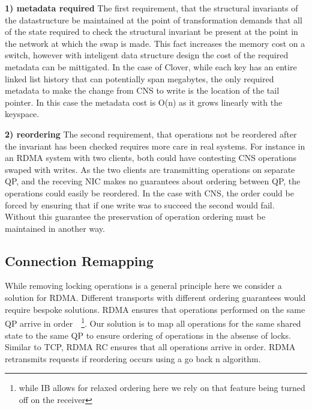 \textbf{1) metadata required} The first requirement, that the structural invariants
of the datastructure be maintained at the point of transformation demands that
all of the state required to check the structural invariant be present at the
point in the network at which the swap is made. This fact increases the memory
cost on a switch, however with inteligent data structure design the cost of the
required metadata can be mittigated. In the case of Clover, while each key has
an entire linked list history that can potentially span megabytes, the only
required metadata to make the change from CNS to write is the location of the
tail pointer. In this case the metadata cost is O(n) as it grows linearly with
the keyspace.

\textbf{2) reordering} The second requirement, that operations not be reordered
after the invariant has been checked requires more care in real systems. For
instance in an RDMA system with two clients, both could have contesting CNS
operations swaped with writes. As the two clients are transmitting operations on
separate QP, and the receving NIC makes no guarantees about ordering between QP,
the operations could easily be reordered. In the case with CNS, the order could
be forced by ensuring that if one write was to succeed the second would fail.
Without this guarantee the preservation of operation ordering must be maintained
in another way.

\subsection{Connection Remapping}

While removing locking operations is a general principle here we consider a
solution for RDMA. Different transports with different ordering guarantees would
require bespoke solutions. RDMA ensures that operations performed on the same QP
arrive in order~\cite{infiniband spec}~\footnote{while IB allows for relaxed
ordering here we rely on that feature being turned off on the receiver}. Our
solution is to map all operations for the same shared state to the same QP to
ensure ordering of operations in the absense of locks. Similar to TCP, RDMA RC
ensures that all operations arrive in order. RDMA retransmits requests if
reordering occurs using a go back n algorithm.

